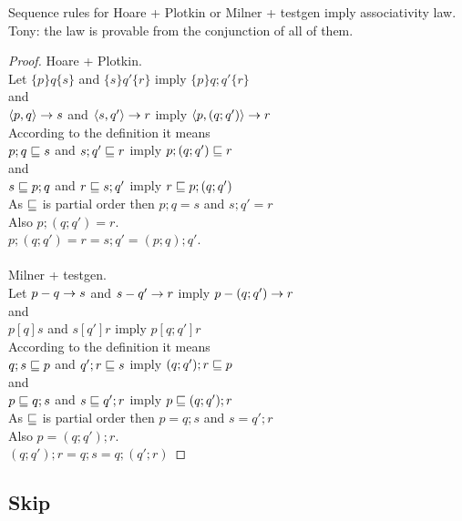 \documentclass{article}
\begin{document}
\begin{theorem}
Sequence rules for Hoare + Plotkin or Milner + testgen imply associativity law.\\
\color{red}Tony: the law is provable from the conjunction of all of them.
\end{theorem}

\verified

\begin{proof}
Hoare + Plotkin.\\
Let $\{p\}q\{s\}$ and $\{s\}q'\{r\}$ imply $\{p\}q;q'\{r\}$\\
and\\
$\left< p, q \right> \rightarrow s$ and $\left< s, q' \right> \rightarrow r$ imply $\left< p, (q;q') \right> \rightarrow r$\\
According to the definition it means\\
$p; q \sqsubseteq s$ and $s; q' \sqsubseteq r$ imply $p; (q; q') \sqsubseteq r$\\
and\\
$s \sqsubseteq p; q$ and $r \sqsubseteq s; q'$ imply $r \sqsubseteq p; (q; q')$\\
As $\sqsubseteq$ is partial order then $p; q = s$ and $s; q' = r$\\
Also $p; (q; q') = r$.\\
$p; (q; q') = r = s; q' = (p; q); q'$.\\
\\
Milner + testgen.\\
Let $p-q\rightarrow s$ and $s-q'\rightarrow r$ imply $p-(q;q')\rightarrow r$\\
and\\
$p [q] s$ and $s [q'] r$ imply $p [q; q'] r$\\
According to the definition it means\\
$q; s \sqsubseteq p$ and $q'; r \sqsubseteq s$ imply $(q; q'); r \sqsubseteq p$\\
and\\
$p \sqsubseteq q; s$ and $s \sqsubseteq q'; r$ imply $p \sqsubseteq (q; q'); r$\\
As $\sqsubseteq$ is partial order then $p = q; s$ and $s = q'; r$\\
Also $p = (q; q'); r$.\\
$(q; q'); r = q; s = q; (q'; r)$
\end{proof}

\subsection*{Skip}
\end{document}
